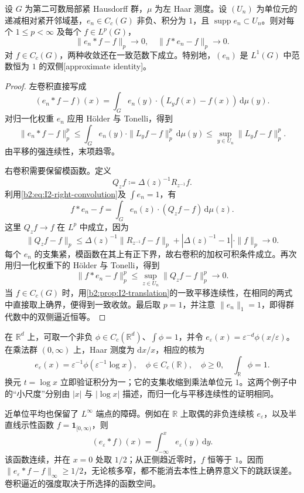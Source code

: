 \begin{theorem}[群上的逼近恒等]
\label{b2:thm:I2-approximate-identity}
设 \(G\) 为第二可数局部紧 Hausdorff 群，\(\mu\) 为左 Haar 测度。设 \((U_n)\) 为单位元的递减相对紧开邻域基，\(e_n\in C_c(G)\) 非负、积分为 \(1\)，且 \(\operatorname{supp}e_n\subset U_n\)。则对每个 \(1\le p<\infty\) 及每个 \(f\in L^p(G)\)，
\[
 \|e_n*f-f\|_p\longrightarrow0,\quad
 \|f*e_n-f\|_p\longrightarrow0.
\]
对 \(f\in C_c(G)\)，两种收敛还在一致范数下成立。特别地，\((e_n)\) 是 \(L^1(G)\) 中范数恒为 \(1\) 的双侧[approximate identity]。
\end{theorem}
\begin{proof}
左卷积直接写成
\[
 (e_n*f-f)(x)=\int_G e_n(y)\cdot(L_yf(x)-f(x))\,\mathrm d\mu(y).
\]
对归一化权重 \(e_n\) 应用 Hölder 与 Tonelli，得到
\[
 \|e_n*f-f\|_p^p
 \le\int_G e_n(y)\cdot\|L_yf-f\|_p^p\,\mathrm d\mu(y)
 \le\sup_{y\in U_n}\|L_yf-f\|_p^p.
\]
由平移的强连续性，末项趋零。

右卷积需要保留模函数。定义
\[
 Q_zf\coloneqq\Delta(z)^{-1}R_{z^{-1}}f.
\]
利用\eqref{b2:eq:I2-right-convolution}及 \(\int e_n=1\)，有
\[
 f*e_n-f=\int_G e_n(z)\cdot(Q_zf-f)\,\mathrm d\mu(z).
\]
这里 \(Q_zf\to f\) 在 \(L^p\) 中成立，因为
\[
 \|Q_zf-f\|_p
 \le\Delta(z)^{-1}\|R_{z^{-1}}f-f\|_p
       +|\Delta(z)^{-1}-1|\cdot\|f\|_p
 \longrightarrow0.
\]
每个 \(e_n\) 的支集紧，模函数在其上有正下界，故右卷积的加权可积条件成立。再次用归一化权重下的 Hölder 与 Tonelli，得到
\[
 \|f*e_n-f\|_p^p\le\sup_{z\in U_n}\|Q_zf-f\|_p^p\longrightarrow0.
\]
当 \(f\in C_c(G)\) 时，用\cref{b2:prop:I2-translation}的一致平移连续性，在相同的两式中直接取上确界，便得到一致收敛。最后取 \(p=1\)，并注意 \(\|e_n\|_1=1\)，即得群代数中的双侧逼近恒等。
\end{proof}

在 \(\mathbb R^d\) 上，可取一个非负 \(\phi\in C_c(\mathbb R^d)\)、\(\int\phi=1\)，并令 \(e_\varepsilon(x)=\varepsilon^{-d}\phi(x/\varepsilon)\)。在乘法群 \((0,\infty)\) 上，Haar 测度为 \(\mathrm dx/x\)，相应的核为
\[
 e_\varepsilon(x)=\varepsilon^{-1}\phi(\varepsilon^{-1}\log x),
 \quad \phi\in C_c(\mathbb R),\quad \phi\ge0,\quad\int_{\mathbb R}\phi=1.
\]
换元 \(t=\log x\) 立即验证积分为一；它的支集收缩到乘法单位元 \(1\)。这两个例子中的“小尺度”分别由 \(|x|\) 与 \(|\log x|\) 描述，而归一化与平移连续性的证明相同。

近单位平均也保留了 \(L^\infty\) 端点的障碍。例如在 \(\mathbb R\) 上取偶的非负连续核 \(e_\varepsilon\)，以及半直线示性函数 \(f=\mathbf1_{[0,\infty)}\)，则
\[
 (e_\varepsilon*f)(x)=\int_{-\infty}^{x}e_\varepsilon(y)\,\mathrm dy.
\]
该函数连续，并在 \(x=0\) 处取 \(1/2\)；从正侧趋近零时，\(f\) 恒等于 \(1\)。因而 \(\|e_\varepsilon*f-f\|_\infty\ge1/2\)，无论核多窄，都不能消去本性上确界意义下的跳跃误差。卷积逼近的强度取决于所选择的函数空间。

